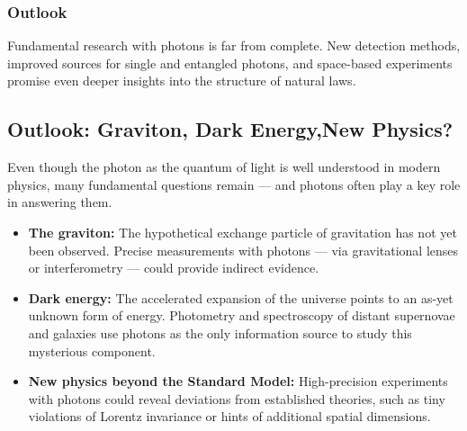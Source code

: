 \subsubsection{Outlook}

Fundamental research with photons is far from complete. 
New detection methods, improved sources for single and entangled photons, and space-based experiments promise even deeper insights into the structure of natural laws.


\subsection{Outlook: Graviton, Dark Energy,\newline New Physics?}

Even though the photon as the quantum of light is well understood in modern physics, many fundamental questions remain — and photons often play a key role in answering them.

\begin{itemize}
	\item \textbf{The graviton:} The hypothetical exchange particle of gravitation has not yet been observed. Precise measurements with photons — via gravitational lenses or interferometry — could provide indirect evidence.
	\item \textbf{Dark energy:} The accelerated expansion of the universe points to an as-yet unknown form of energy. Photometry and spectroscopy of distant supernovae and galaxies use photons as the only information source to study this mysterious component.
	\item \textbf{New physics beyond the Standard Model:} High-precision experiments with photons could reveal deviations from established theories, such as tiny violations of Lorentz invariance or hints of additional spatial dimensions.
\end{itemize}

